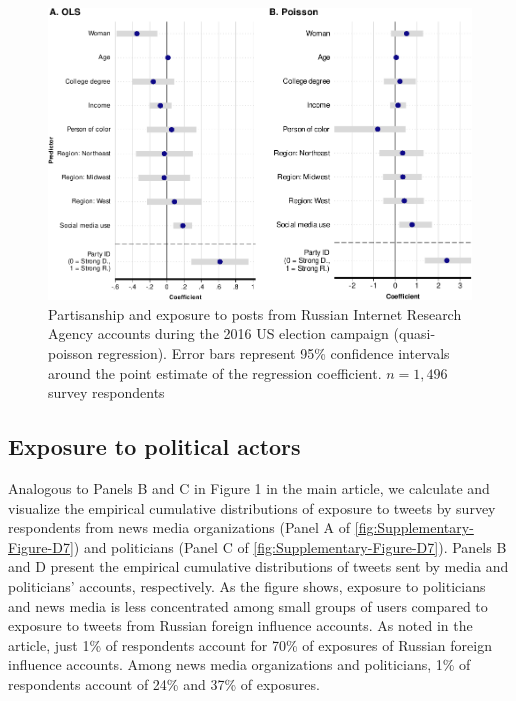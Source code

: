 \documentclass[
  12pt,
]{article}
\begin{document}
\begin{figure}[h]

{\centering \includegraphics[width=1\linewidth,height=0.6\textheight]{Supplementary_Information_files/figure-latex/Supplementary-Figure-C6-1} 

}

\caption{Partisanship and exposure to posts from Russian Internet Research Agency accounts during the 2016 US election campaign (quasi-poisson regression). Error bars represent 95\% confidence intervals around the point estimate of the regression coefficient. $n = 1,496$ survey respondents}\label{fig:Supplementary-Figure-C6}
\end{figure}

\clearpage

\hypertarget{exposure-to-political-actors}{%
\subsection{Exposure to political actors}\label{exposure-to-political-actors}}

Analogous to Panels B and C in Figure 1 in the main article, we calculate and visualize the empirical cumulative distributions of exposure to tweets by survey respondents from news media organizations (Panel A of \autoref{fig:Supplementary-Figure-D7}) and politicians (Panel C of \autoref{fig:Supplementary-Figure-D7}). Panels B and D present the empirical cumulative distributions of tweets sent by media and politicians' accounts, respectively. As the figure shows, exposure to politicians and news media is less concentrated among small groups of users compared to exposure to tweets from Russian foreign influence accounts. As noted in the article, just 1\% of respondents account for 70\% of exposures of Russian foreign influence accounts. Among news media organizations and politicians, 1\% of respondents account of 24\% and 37\% of exposures.
\end{document}
